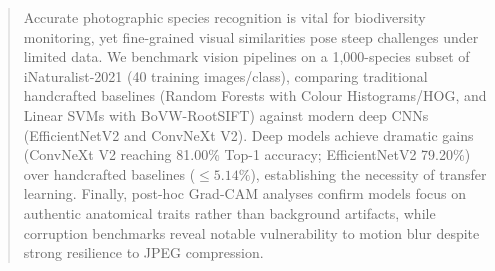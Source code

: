 \begin{abstract}
Accurate photographic species recognition is vital for biodiversity monitoring, yet fine-grained visual similarities pose steep challenges under limited data. We benchmark vision pipelines on a 1{,}000-species subset of iNaturalist-2021 (40 training images/class), comparing traditional handcrafted baselines (Random Forests with Colour Histograms/HOG, and Linear SVMs with BoVW-RootSIFT) against modern deep CNNs (EfficientNetV2 and ConvNeXt V2). Deep models achieve dramatic gains (ConvNeXt V2 reaching 81.00\% Top-1 accuracy; EfficientNetV2 79.20\%) over handcrafted baselines ($\le 5.14\%$), establishing the necessity of transfer learning. Finally, post-hoc Grad-CAM analyses confirm models focus on authentic anatomical traits rather than background artifacts, while corruption benchmarks reveal notable vulnerability to motion blur despite strong resilience to JPEG compression.
\end{abstract}
